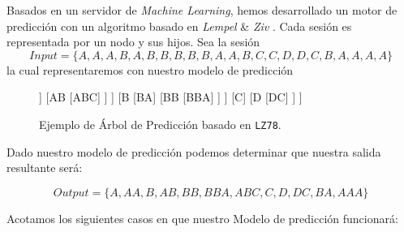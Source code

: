 
Basados en un servidor de \emph{Machine Learning}, hemos desarrollado un motor de predicción con un algoritmo basado en \emph{Lempel} \& \emph{Ziv} \cite{ZivLempel1977}. Cada sesión es representada por un nodo y sus hijos. Sea la sesión \begin{equation}
Input = \{ A,A,A,B,A,B,B,B,B,B,A,A,B,C,C,D,D,C,B,A,A,A,A \}
\end{equation} la cual representaremos con nuestro modelo de predicción



\begin{figure}[h] 
	\centering
	\begin{forest} 
	[ $\epsilon$
		[A
			[AA
				[AAA]	
			]
			[AB
				[ABC]
			]
		]
		[B
			[BA]
			[BB
				[BBA]
			]
		]
		[C]
		[D
			[DC]
		]
	]
	\end{forest}
	\caption{Ejemplo de Árbol de Predicción basado en \texttt{LZ78}.}
	\label{fig:lztrie1}
\end{figure}

Dado nuestro modelo de predicción podemos determinar que nuestra salida resultante será:

\begin{equation}
Output = \{ A,AA,B,AB,BB,BBA,ABC,C,D,DC,BA,AAA \}
\end{equation}


Acotamos los siguientes casos en que nuestro Modelo de predicción funcionará:


